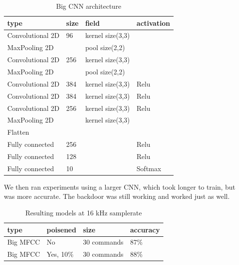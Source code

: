 \documentclass{report}
\theoremstyle{definition}
\theoremstyle{remark}
\begin{document}
\begin{table}[!hbt]
\centering
\begin{tabular}{llll}
\hline
type & size & field & activation \\ \hline
Convolutional 2D & 96 & kernel size(3,3) &  \\
MaxPooling 2D &  & pool size(2,2) &  \\
Convolutional 2D & 256 & kernel size(3,3) &  \\
MaxPooling 2D &  & pool size(2,2) &  \\
Convolutional 2D & 384 & kernel size(3,3) & Relu \\
Convolutional 2D & 384 & kernel size(3,3) & Relu \\
Convolutional 2D & 256 & kernel size(3,3) & Relu \\
MaxPooling 2D & & kernel size(3,3) &  \\
Flatten & & &  \\
Fully connected & 256 & & Relu  \\
Fully connected & 128 & & Relu \\ 
Fully connected & 10 & & Softmax \\ 
\hline
\end{tabular}
\caption{Big CNN architecture}
\end{table}
We then ran experiments using a larger CNN, which took longer to train, but was more accurate. The backdoor was still working and worked just as well.

\begin{table}[!hbt]
\centering
\begin{tabular}{|l|l|l|l|}
\hline
type & poisened & size & accuracy \\ \hline
Big MFCC & No  &  30 commands  &  87\% \\ \hline
Big MFCC & Yes, 10\%  &  30 commands  & 88\%          \\ \hline
\end{tabular}
\caption{Resulting models at 16 kHz samplerate}
\end{table}

\end{document}
